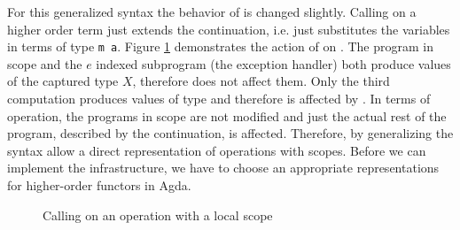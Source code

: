 For this generalized syntax the behavior of \AgdaFunction{>>=} is changed
slightly.
Calling \AgdaFunction{>>=} on a higher order term just extends the continuation,
i.e. just substitutes the variables in terms of type \texttt{m a}.
Figure \ref{higher-order:syntax:bind} demonstrates the action of
\AgdaFunction{>>=} on .
The program in scope and the $e$ indexed subprogram (the exception handler) both
produce values of the captured type $X$, therefore \AgdaFunction{>>=} does not
affect them.
Only the third computation produces values of type  and
therefore is affected by \AgdaFunction{>>=}.
In terms of operation, the programs in scope are not modified and just the
actual rest of the program, described by the continuation, is affected.
Therefore, by generalizing the syntax \textcite{DBLP:conf/haskell/WuSH14} allow
a direct representation of operations with scopes.
Before we can implement the infrastructure, we have to choose an appropriate
representations for higher-order functors in Agda.

\begin{figure}
  \begin{center}
  \end{center}
  \caption{Calling \bind{} on an operation with a local scope}
  \label{higher-order:syntax:bind}
\end{figure}


